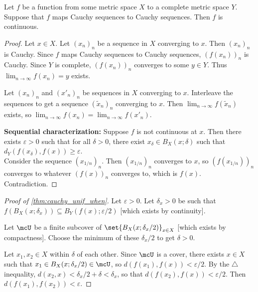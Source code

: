 \documentclass[12pt]{article}
\begin{document}
\begin{lemma}
    Let $f$ be a function from some metric space $X$ to a
    complete metric space $Y$.
    Suppose that $f$ maps Cauchy sequences to Cauchy sequences.
    Then $f$ is continuous.
\end{lemma}
\begin{proof}
    Let $x \in X$.
    Let $(x_n)_n$ be a sequence in $X$ converging to $x$.
    Then $(x_n)_n$ is Cauchy.
    Since $f$ maps Cauchy sequences to Cauchy sequences,
    $(f(x_n))_n$ is Cauchy.
    Since $Y$ is complete, $(f(x_n))_n$ converges to some $y \in Y$.
    Thus $\lim_{n \to \infty} f(x_n) = y$ exists.

    Let $(x_n)_n$ and $(x'_n)_n$ be sequences in $X$ converging to $x$.
    Interleave the sequences to get a sequence $(\tilde{x}_n)_n$
    converging to $x$.
    Then $\lim_{n \to \infty} f(\tilde{x}_n)$ exists, so
    $\lim_{n \to \infty} f(x_n) = \lim_{n \to \infty} f(x'_n)$.

    \textbf{Sequential characterization:}
    Suppose $f$ is not continuous at $x$.
    Then there exists $\varepsilon > 0$ such that for all $\delta > 0$,
    there exist $x_\delta \in B_X(x; \delta)$ such that
    $d_Y(f(x_\delta), f(x)) \ge \varepsilon$. \\
    Consider the sequence $(x_{1/n})_n$.
    Then $(x_{1/n})_n$ converges to $x$, so $(f(x_{1/n}))_n$ converges to
    whatever $(f(x))_n$ converges to, which is $f(x)$.
    Contradiction.
\end{proof}

\begin{proof}[Proof of \cref{thm:cauchy_unif_when}]
    Let $\varepsilon > 0$.
    Let $\delta_x > 0$ be such that
    $f(B_X(x; \delta_x)) \subseteq B_Y(f(x); \varepsilon/2)$
    {\footnotesize [which exists by continuity]}.

    Let $\mcU$ be a finite subcover of $\set{B_X(x; \delta_x/2)}_{x \in X}$
    {\footnotesize [which exists by compactness]}.
    Choose the minimum of these $\delta_x/2$ to get $\delta > 0$.

    Let $x_1, x_2 \in X$ within $\delta$ of each other.
    Since $\mcU$ is a cover, there exists $x \in X$ such that
    $x_1 \in B_X(x; \delta_x/2) \in \mcU$, so
    $d(f(x_1), f(x)) < \varepsilon/2$.
    By the $\triangle$ inequality,
    $d(x_2, x) < \delta_x/2 + \delta < \delta_x$,
    so that $d(f(x_2), f(x)) < \varepsilon/2$.
    Then $d(f(x_1), f(x_2)) < \varepsilon$.
\end{proof}
\end{document}
